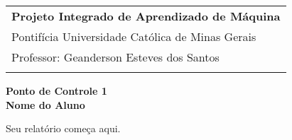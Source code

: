 \documentclass[a4paper,12pt]{article}
\begin{document}
\thispagestyle{empty}

\begin{tabular}{p{15.5cm}}
{\large \bf Projeto Integrado de Aprendizado de Máquina} \\
Pontifícia Universidade Católica de Minas Gerais \\ Professor: Geanderson Esteves dos Santos\\
\hline
\\
\end{tabular}

\vspace*{0.3cm}

\begin{center}
	{\Large \bf Ponto de Controle 1}\\
	\vspace{2mm}
	{\bf Nome do Aluno}
\end{center}  

\vspace{0.4cm}

Seu relatório começa aqui.
\end{document}
